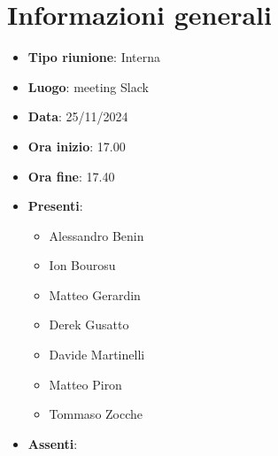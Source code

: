 \section{Informazioni generali}
\begin{itemize}
  \item \textbf{Tipo riunione}: Interna
  \item \textbf{Luogo}: meeting Slack
  \item \textbf{Data}: 25/11/2024
  \item \textbf{Ora inizio}: 17.00
  \item \textbf{Ora fine}: 17.40
  
  \item \textbf{Presenti}:
  \begin{itemize}
    \item Alessandro Benin
    \item Ion Bourosu
    \item Matteo Gerardin
    \item Derek Gusatto
    \item Davide Martinelli
    \item Matteo Piron
    \item Tommaso Zocche
  \end{itemize}

  \item \textbf{Assenti}:
 
\end{itemize}